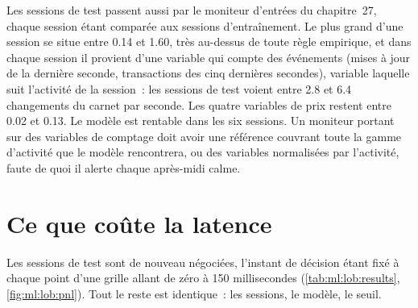 Les sessions de test passent aussi par le moniteur d'entrées du chapitre~27, chaque session étant comparée aux sessions d'entraînement. Le plus grand 
d'une session se situe entre 0.14 et 1.60, très au-dessus de toute règle empirique, et dans chaque session il provient d'une variable
qui compte des événements (mises à jour de la dernière seconde, transactions des cinq dernières secondes), variable laquelle suit l'activité de la session~: les sessions de test
voient entre 2.8 et 6.4 changements du carnet par seconde. Les quatre variables de prix restent entre 0.02 et 0.13. Le modèle est rentable
dans les six sessions. Un moniteur portant sur des variables de comptage doit avoir une référence couvrant toute la gamme d'activité que le modèle rencontrera, ou
des variables normalisées par l'activité, faute de quoi il alerte chaque après-midi calme.

\section{Ce que coûte la latence}

Les sessions de test sont de nouveau négociées, l'instant de décision étant fixé à chaque point d'une grille allant de zéro à 150 millisecondes
(\cref{tab:ml:lob:results}, \cref{fig:ml:lob:pnl}). Tout le reste est identique~: les sessions, le modèle, le seuil.

